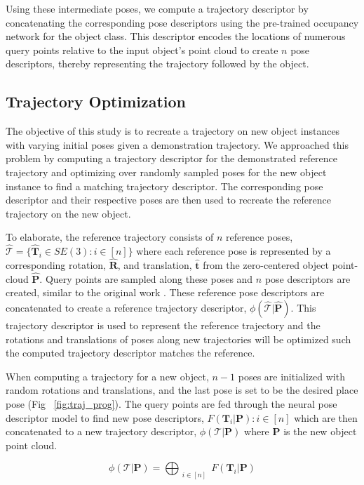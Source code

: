 \documentclass[10pt,twocolumn,letterpaper]{article}
\begin{document}
Using these intermediate poses, we compute a trajectory descriptor by concatenating the corresponding pose descriptors using the pre-trained occupancy network for the object class. This descriptor encodes the locations of numerous query points relative to the input object's point cloud to create $n$ pose descriptors, thereby representing the trajectory followed by the object.    


\subsection{Trajectory Optimization}

The objective of this study is to recreate a trajectory on new object instances with varying initial poses given a demonstration trajectory. We approached this problem by computing a trajectory descriptor for the demonstrated reference trajectory and optimizing over randomly sampled poses for the new object instance to find a matching trajectory descriptor. The corresponding pose descriptor and their respective poses are then used to recreate the reference trajectory on the new object.

To elaborate, the reference trajectory consists of $n$ reference poses, $\hat{\mathcal{T}} = \{\hat{\mathbf{T}}_i \in SE(3) : i \in [n]\}$ where each reference pose is represented by a corresponding rotation, $\hat{\mathbf{R}}$, and translation, $\hat{\mathbf{t}}$ from the zero-centered object point-cloud $\hat{\mathbf{P}}$. Query points are sampled along these poses and $n$ pose descriptors are created, similar to the original work \cite{simeonovdu2021ndf}. These reference pose descriptors are concatenated to create a reference trajectory descriptor, $\phi(\hat{\mathcal{T}}|\hat{\mathbf{P}})$. This trajectory descriptor is used to represent the reference trajectory and the rotations and translations of poses along new trajectories will be optimized such the computed trajectory descriptor matches the reference.

When computing a trajectory for a new object, $n-1$ poses are initialized with random rotations and translations, and the last pose is set to be the desired place pose (Fig ~\ref{fig:traj_prog}). The query points are fed through the neural pose descriptor model to find new pose descriptors, $F(\mathbf{T}_i|\mathbf{P}): i \in [n]$ which are then concatenated to a new trajectory descriptor, $\phi(\mathcal{T}|\mathbf{P})$ where $\mathbf{P}$ is the new object point cloud. 

\begin{equation}
\phi(\mathcal{T}|\mathbf{P}) = \bigoplus_{\substack{i \in [n]}} F(\mathbf{T}_i|\mathbf{P})
\end{equation}
\end{document}

